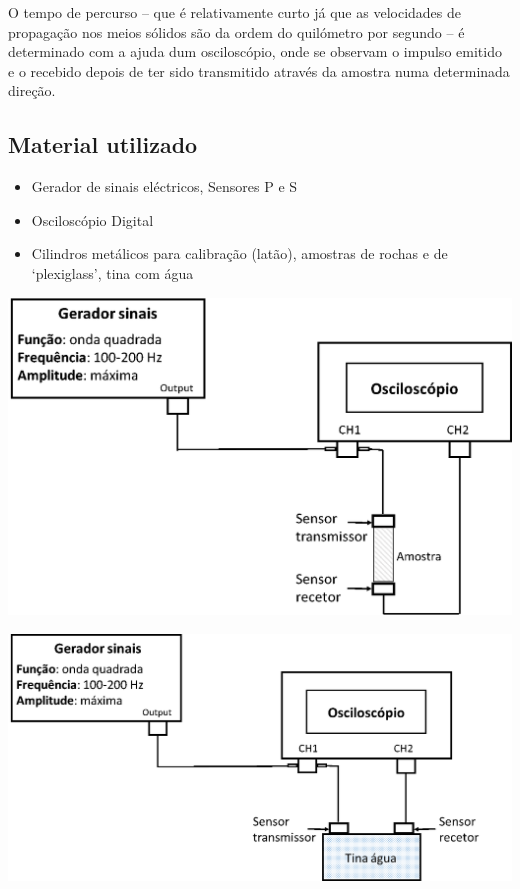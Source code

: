 \documentclass[a4paper,12pt]{article}
\begin{document}
O tempo de percurso -- que é relativamente curto já que as velocidades de propagação nos meios sólidos são da ordem do quilómetro por segundo -- é determinado com a ajuda dum osciloscópio, onde se observam o impulso emitido e o recebido depois de ter sido transmitido através da amostra numa determinada direção. 

\subsection{\sf Material utilizado}
\begin{itemize}
\item Gerador de sinais eléctricos, Sensores P e S
\item Osciloscópio Digital
\item Cilindros metálicos para calibração (latão), amostras de rochas e de ‘plexiglass’, tina com água
\end{itemize}

\noindent\begin{minipage}[c]{0.5\textwidth}
\centering
	\includegraphics[width=0.9\linewidth]{esquema_amostra}
\end{minipage}
\begin{minipage}[c]{0.5\textwidth}
\begin{center}
	\includegraphics[width=0.7\linewidth]{esquema_tina}
\end{center}
\end{minipage}
\begin{center}
\end{center}
\end{document}
